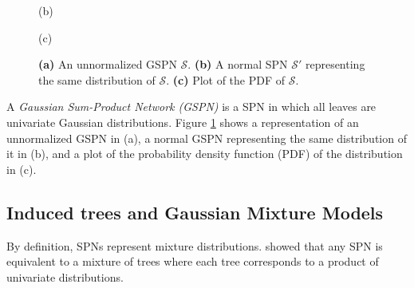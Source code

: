 \documentclass[12pt]{article}
\begin{document}
\begin{figure}
\begin{minipage}{0.31\textwidth}
    (b)
  \end{minipage}\begin{minipage}{0.38\textwidth}
    \centering

    (c)
  \end{minipage}

  \caption{
    \textbf{(a)} An unnormalized GSPN $\mathcal{S}$.
    \textbf{(b)} A normal SPN $\mathcal{S'}$ representing the same distribution of $\mathcal{S}$.
    \textbf{(c)} Plot of the PDF of $\mathcal{S}$.
  }
  \label{fig:gspn}
\end{figure}

A \emph{Gaussian Sum-Product Network (GSPN)} is a SPN in which all leaves are univariate Gaussian distributions. Figure \ref{fig:gspn} shows a representation of an unnormalized GSPN in (a), a normal GSPN representing the same distribution of it in (b), and a plot of the probability density function (PDF) of the distribution in (c).

\subsection{Induced trees and Gaussian Mixture Models}
\label{subsec:mixtures}

By definition, SPNs represent mixture distributions. \cite{Zhao2016} showed that any SPN is equivalent to a mixture of trees where each tree corresponds to a product of univariate distributions.
\end{document}
